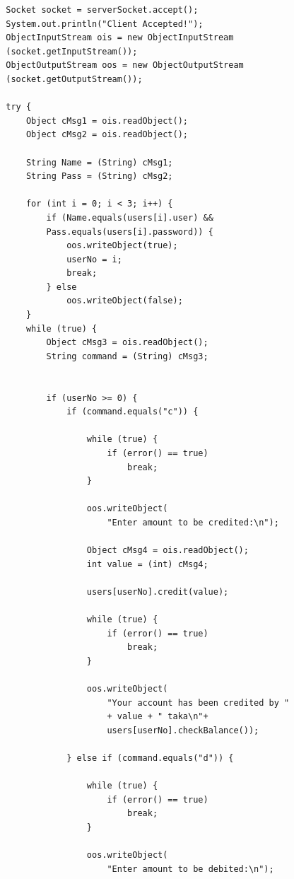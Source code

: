 \documentclass[11pt]{article}
\begin{document}
\begin{verbatim}
        Socket socket = serverSocket.accept();
        System.out.println("Client Accepted!");
        ObjectInputStream ois = new ObjectInputStream
        (socket.getInputStream());
        ObjectOutputStream oos = new ObjectOutputStream
        (socket.getOutputStream());

        try {
            Object cMsg1 = ois.readObject();
            Object cMsg2 = ois.readObject();

            String Name = (String) cMsg1;
            String Pass = (String) cMsg2;

            for (int i = 0; i < 3; i++) {
                if (Name.equals(users[i].user) && 
                Pass.equals(users[i].password)) {
                    oos.writeObject(true);
                    userNo = i;
                    break;
                } else
                    oos.writeObject(false);
            }
            while (true) {
                Object cMsg3 = ois.readObject();
                String command = (String) cMsg3;


                if (userNo >= 0) {
                    if (command.equals("c")) {

                        while (true) {
                            if (error() == true)
                                break;
                        }

                        oos.writeObject(
                            "Enter amount to be credited:\n");

                        Object cMsg4 = ois.readObject();
                        int value = (int) cMsg4;

                        users[userNo].credit(value);

                        while (true) {
                            if (error() == true)
                                break;
                        }

                        oos.writeObject(
                            "Your account has been credited by " 
                            + value + " taka\n"+ 
                            users[userNo].checkBalance());

                    } else if (command.equals("d")) {

                        while (true) {
                            if (error() == true)
                                break;
                        }

                        oos.writeObject(
                            "Enter amount to be debited:\n");


\end{verbatim}
\end{document}
